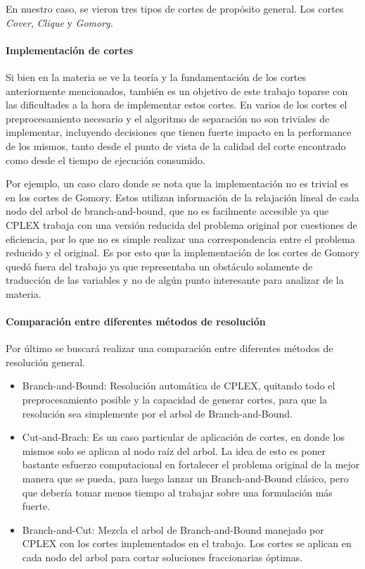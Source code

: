 En nuestro caso, se vieron tres tipos de cortes de prop\'osito general. Los cortes \emph{Cover}, \emph{Clique} y \emph{Gomory}.



\paragraph{Implementaci\'on de cortes} 
\medskip
Si bien en la materia se ve la teor\'ia y la fundamentaci\'on de los cortes anteriormente mencionados, tambi\'en es un objetivo de este trabajo toparse con las dificultades a la hora de implementar estos cortes. En varios de los cortes el preprocesamiento necesario y el algoritmo de separaci\'on no son triviales de implementar, incluyendo decisiones que tienen fuerte impacto en la performance de los mismos, tanto desde el punto de vista de la calidad del corte encontrado como desde el tiempo de ejecuci\'on consumido.

Por ejemplo, un caso claro donde se nota que la implementaci\'on no es trivial es en los cortes de Gomory. Estos utilizan informaci\'on de la relajaci\'on lineal de cada nodo del arbol de branch-and-bound, que no es facilmente accesible ya que CPLEX trabaja con una versi\'on reducida del problema original por cuestiones de eficiencia, por lo que no es simple realizar una correspondencia entre el problema reducido y el original. Es por esto que la implementaci\'on de los cortes de Gomory qued\'o fuera del trabajo ya que representaba un obst\'aculo solamente de traducci\'on de las variables y no de alg\'un punto interesante para analizar de la materia.

\paragraph{Comparaci\'on entre diferentes m\'etodos de resoluci\'on} 
\medskip
Por \'ultimo se buscar\'a realizar una comparaci\'on entre diferentes m\'etodos de resoluci\'on general.

\begin{itemize}
\item Branch-and-Bound: Resoluci\'on autom\'atica de CPLEX, quitando todo el preprocesamiento posible y la capacidad de generar cortes, para que la resoluci\'on sea simplemente por el arbol de Branch-and-Bound.
\item Cut-and-Brach: Es un caso particular de aplicaci\'on de cortes, en donde los mismos solo se aplican al nodo ra\'iz del arbol. La idea de esto es poner bastante esfuerzo computacional en fortalecer el problema original de la mejor manera que se pueda, para luego lanzar un Branch-and-Bound cl\'asico, pero que deber\'ia tomar menos tiempo al trabajar sobre una formulaci\'on m\'as fuerte.
\item Branch-and-Cut: Mezcla el arbol de Branch-and-Bound manejado por CPLEX con los cortes implementados en el trabajo. Los cortes se aplican en cada nodo del arbol para cortar soluciones fraccionarias \'optimas.
\end{itemize}

